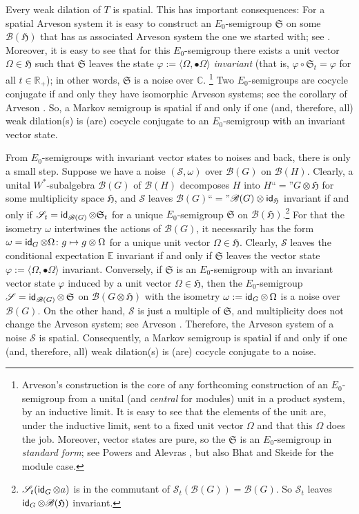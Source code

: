 \documentclass[11pt]{article}
\numberwithin{equation}{section}
\newcommand{\msf}[1]{\text{\small $\sf{#1}$}}
\newcommand{\eus}[1]{\mathscr{#1}}
\newcommand{\euf}[1]{\mathfrak{#1}}
\newcommand{\bb}[1]{\mathbb{#1}}
\newcommand{\vp}{\varphi}
\newcommand{\om}{\omega}
\newcommand{\Om}{\Omega}
\newcommand{\AB}[1]{\langle#1\rangle}
\DeclareMathOperator{\id}{\normalfont\msf{id}}
\DeclareMathOperator{\ssid}{\text{\footnotesize\sf{id}}}
\newcommand{\C}{\bb{C}}
\newcommand{\E}{\bb{E}}
\newcommand{\R}{\bb{R}}
\newcommand{\sB}{\eus{B}}
\newcommand{\sS}{\eus{S}}
\newcommand{\eH}{\euf{H}}
\newcommand{\eS}{\euf{S}}
\numberwithin{equation}{section}
\begin{document}
Every weak dilation of $T$ is spatial. This has important consequences: For a spatial Arveson system it is easy to construct an $E_0$-semigroup $\eS$ on some $\sB(\eH)$ that has as associated Arveson system the one we started with; see \cite[Appendix]{Arv89}. Moreover, it is easy to see that for this $E_0$-semigroup there exists a unit vector $\Om\in\eH$ such that $\eS$ leaves the state $\vp:=\AB{\Om,\bullet\Om}$ \emph{invariant} (that is, $\vp\circ\eS_t=\vp$ for all $t\in\R_+$); in other words, $\eS$ is a noise over $\C$.%
\footnote{Arveson's construction is the core of any forthcoming construction of an $E_0$-semigroup from a unital (and {\it central} for modules) unit in a product system, by an inductive limit. It is easy to see that the elements of the unit are, under the inductive limit, sent to a fixed unit vector $\Om$ and that this $\Om$ does the job. Moreover, vector states are pure, so the $\eS$ is an $E_0$-semigroup in {\it standard form}; see Powers \cite{Pow99} and Alevras \cite{Ale01}, but also Bhat and Skeide \cite{BhSk00,Ske02,Ske06d} for the module case.}
Two $E_0$-semigroups are cocycle conjugate if and only they have isomorphic Arveson systems; see the corollary of Arveson \cite[Definition 3.20]{Arv89}. So, a Markov semigroup is spatial if and only if one (and, therefore, all) weak dilation(s) is (are) cocycle conjugate to an $E_0$-semigroup with an invariant vector state.

From $E_0$-semigroups with invariant vector states to noises and back, there is only a small step. Suppose we have a noise $(\sS,\om)$ over $\sB(G)$ on $\sB(H)$. Clearly, a unital $W^*$-subalgebra $\sB(G)$ of $\sB(H)$ decomposes $H$ into $H$``$=$''$G\otimes\eH$ for some multiplicity space $\eH$, and $\sS$ leaves $\sB(G)$``$=$''$\sB(G)\otimes\id_\eH$ invariant if and only if $\sS_t=\id_{\sB(G)}\otimes\eS_t$ for a unique $E_0$-semigroup $\eS$ on $\sB(\eH)$.\footnote{$\sS_t(\ssid_G\otimes a)$ is in the commutant of $\sS_t(\sB(G))=\sB(G)$. So $\sS_t$ leaves $\ssid_G\otimes\sB(\eH)$ invariant.}
For that the isometry $\om$ intertwines the actions of $\sB(G)$, it necessarily has the form $\om=\id_G\otimes\Om\colon g\mapsto g\otimes\Om$ for a unique unit vector $\Om\in\eH$. Clearly, $\sS$ leaves the conditional expectation $\E$ invariant if and only if $\eS$ leaves the vector state $\vp:=\AB{\Om,\bullet\Om}$ invariant. Conversely, if $\eS$ is an $E_0$-semigroup with an invariant vector state $\vp$ induced by a unit vector $\Om\in\eH$, then the $E_0$-semigroup $\sS=\id_{\sB(G)}\otimes\,\eS$ on $\sB(G\otimes\eH)$ with the isometry $\om:=\id_G\otimes \,\Om$ is a noise over~$\sB(G)$. On the other hand, $\sS$ is just a multiple of $\eS$, and multiplicity does not change the Arveson system; see Arveson \cite[Poposition~3.15]{Arv89}. Therefore, the Arveson system of a noise $\sS$ is spatial. Consequently, a Markov semigroup is spatial if and only if one (and, therefore, all) weak dilation(s) is (are) cocycle conjugate to a noise.
\end{document}
